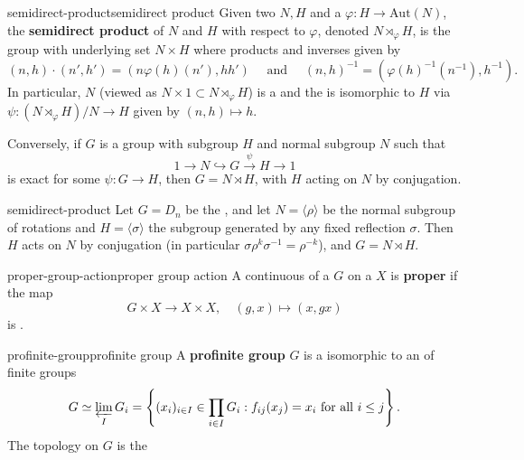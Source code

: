 \begin{topic}{semidirect-product}{semidirect product}
    Given two  $N, H$ and a  $\varphi : H \to \text{Aut}(N)$, the \textbf{semidirect product} of $N$ and $H$ with respect to $\varphi$, denoted $N \rtimes_\varphi H$, is the group with underlying set $N \times H$ where products and inverses given by
    \[ (n, h) \cdot (n', h') = (n \varphi(h)(n'), h h') \quad \text{ and } \quad (n, h)^{-1} = (\varphi(h)^{-1}(n^{-1}), h^{-1}) . \]
    In particular, $N$ (viewed as $N \times 1 \subset N \rtimes_\varphi H$) is a  and the  is isomorphic to $H$ via $\psi : (N \rtimes_\varphi H)/N \to H$ given by $(n, h) \mapsto h$.
    
    Conversely, if $G$ is a group with subgroup $H$ and normal subgroup $N$ such that
    \[ 1 \to N \hookrightarrow G \xrightarrow{\psi} H \to 1 \]
    is exact for some $\psi : G \to H$, then $G = N \rtimes H$, with $H$ acting on $N$ by conjugation.
\end{topic}

\begin{example}{semidirect-product}
    Let $G = D_{n}$ be the , and let $N = \langle \rho \rangle$ be the normal subgroup of rotations and $H = \langle \sigma \rangle$ the subgroup generated by any fixed reflection $\sigma$. Then $H$ acts on $N$ by conjugation (in particular $\sigma \rho^k \sigma^{-1} = \rho^{-k}$), and $G = N \rtimes H$.
\end{example}

\begin{topic}{proper-group-action}{proper group action}
    A continuous  of a  $G$ on a  $X$ is \textbf{proper} if the map
    \[ G \times X \to X \times X, \quad (g, x) \mapsto (x, gx) \]
    is .
\end{topic}

\begin{topic}{profinite-group}{profinite group}
    A \textbf{profinite group} $G$ is a  isomorphic to an  of  finite groups
    \[ G \simeq \varprojlim_I G_i = \left\{ (x_i)_{i \in I} \in \prod_{i \in I} G_i : f_{ij}(x_j) = x_i \text{ for all } i \le j \right\} . \]
    The topology on $G$ is the  
\end{topic}

